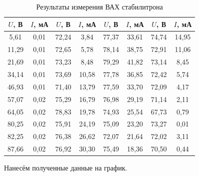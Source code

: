 \documentclass[a4paper,12pt]{article} %
\begin{document}
\begin{table}[H]
	\centering
	\begin{tabular}{|c|c|c|c|c|c|c|c|}
		\hline
		$ U $, В     & $ I $, мА    & $ U $, В     & $ I $, мА     & $ U $, В     & $ I $, мА     & $ U $, В     & $ I $, мА     \\ \hline
		5,61  & 0,01 & 72,24 & 3,84  & 77,37 & 33,61 & 74,74 & 14,95 \\ \hline
		11,29 & 0,01 & 72,65 & 5,78  & 78,14 & 38,75 & 72,91 & 11,06 \\ \hline
		21,69 & 0,01 & 73,23 & 8,48  & 79,29 & 41,82 & 73,14 & 8,45  \\ \hline
		34,14 & 0,01 & 73,69 & 10,58 & 77,78 & 36,85 & 72,42 & 5,74  \\ \hline
		46,93 & 0,01 & 71,40 & 13,79 & 77,59 & 33,70 & 72,09 & 4,17  \\ \hline
		57,07 & 0,02 & 75,29 & 16,79 & 76,98 & 29,19 & 71,14 & 2,11  \\ \hline
		64,05 & 0,02 & 78,83 & 19,78 & 74,93 & 25,54 & 67,73 & 0,79  \\ \hline
		80,25 & 0,02 & 75,91 & 24,19 & 75,09 & 23,20 & 73,27 & 0,01  \\ \hline
		82,25 & 0,02 & 76,38 & 26,62 & 72,07 & 21,64 & 72,02 & 3,11  \\ \hline
		87,66 & 0,02 & 76,92 & 30,30 & 75,49 & 18,36 & 70,50 & 0,44  \\ \hline
	\end{tabular}
	\caption{Результаты измерения ВАХ стабилитрона}
	\label{tab:tab2}
\end{table}

Нанесём полученные данные на график.
\end{document}
